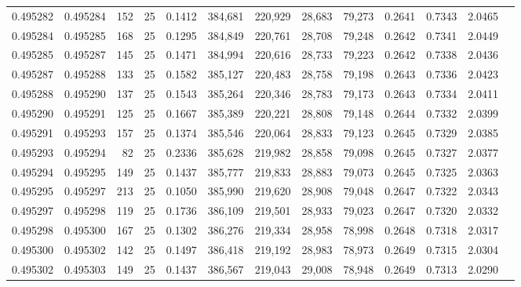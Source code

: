 \begin{tabular}{rrrrrrrrrrrrr}
0.495282 & 0.495284 &   152 &  25 &                                     0.1412 & 384,681 & 220,929 &  28,683 &  79,273 & 0.2641 & 0.7343 & 2.0465 \\
0.495284 & 0.495285 &   168 &  25 &                                     0.1295 & 384,849 & 220,761 &  28,708 &  79,248 & 0.2642 & 0.7341 & 2.0449 \\
0.495285 & 0.495287 &   145 &  25 &                                     0.1471 & 384,994 & 220,616 &  28,733 &  79,223 & 0.2642 & 0.7338 & 2.0436 \\
0.495287 & 0.495288 &   133 &  25 &                                     0.1582 & 385,127 & 220,483 &  28,758 &  79,198 & 0.2643 & 0.7336 & 2.0423 \\
0.495288 & 0.495290 &   137 &  25 &                                     0.1543 & 385,264 & 220,346 &  28,783 &  79,173 & 0.2643 & 0.7334 & 2.0411 \\
0.495290 & 0.495291 &   125 &  25 &                                     0.1667 & 385,389 & 220,221 &  28,808 &  79,148 & 0.2644 & 0.7332 & 2.0399 \\
0.495291 & 0.495293 &   157 &  25 &                                     0.1374 & 385,546 & 220,064 &  28,833 &  79,123 & 0.2645 & 0.7329 & 2.0385 \\
0.495293 & 0.495294 &    82 &  25 &                                     0.2336 & 385,628 & 219,982 &  28,858 &  79,098 & 0.2645 & 0.7327 & 2.0377 \\
0.495294 & 0.495295 &   149 &  25 &                                     0.1437 & 385,777 & 219,833 &  28,883 &  79,073 & 0.2645 & 0.7325 & 2.0363 \\
0.495295 & 0.495297 &   213 &  25 &                                     0.1050 & 385,990 & 219,620 &  28,908 &  79,048 & 0.2647 & 0.7322 & 2.0343 \\
0.495297 & 0.495298 &   119 &  25 &                                     0.1736 & 386,109 & 219,501 &  28,933 &  79,023 & 0.2647 & 0.7320 & 2.0332 \\
0.495298 & 0.495300 &   167 &  25 &                                     0.1302 & 386,276 & 219,334 &  28,958 &  78,998 & 0.2648 & 0.7318 & 2.0317 \\
0.495300 & 0.495302 &   142 &  25 &                                     0.1497 & 386,418 & 219,192 &  28,983 &  78,973 & 0.2649 & 0.7315 & 2.0304 \\
0.495302 & 0.495303 &   149 &  25 &                                     0.1437 & 386,567 & 219,043 &  29,008 &  78,948 & 0.2649 & 0.7313 & 2.0290 \\

\end{tabular}
